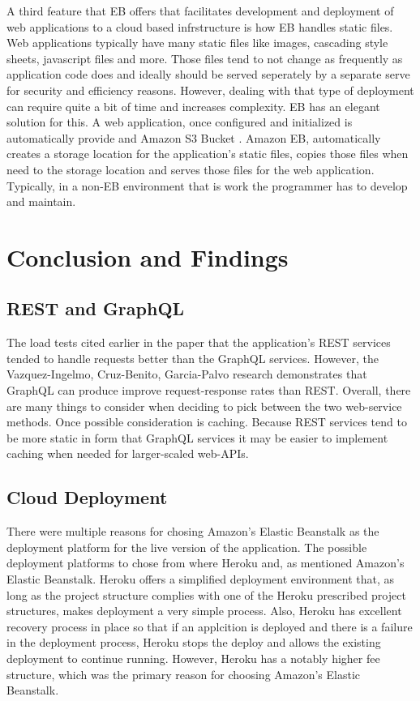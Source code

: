 A third feature that EB offers that facilitates development and deployment of 
web applications to a cloud based infrstructure is how EB handles static 
files.  Web applications typically have many static files like images, 
cascading style sheets, javascript files and more.  Those files tend to not 
change as frequently as application code does and ideally should be served 
seperately by a separate serve for security and efficiency reasons.  However, 
dealing with that type of deployment can require quite a bit of time and 
increases complexity.  EB has an elegant solution for this.  A web application, 
once configured and initialized is automatically provide and Amazon 
S3 Bucket \cite{S3Bucket2018}.  Amazon EB, automatically creates a storage 
location for the application's static files, copies those files when need 
to the storage location and serves those files for the web application.  
Typically, in a non-EB environment that is work the programmer has to develop 
and maintain.

\section{Conclusion and Findings}

\subsection{REST and GraphQL}
The load tests cited earlier in the paper that the application's REST services 
tended to handle requests better than the GraphQL services.  However, the 
Vazquez-Ingelmo, Cruz-Benito, Garcia-Palvo \cite{hid505Vzquez2017} research 
demonstrates that GraphQL can produce improve request-response rates than 
REST.  Overall, there are many things to consider when deciding to pick 
between the two web-service methods.  Once possible consideration is caching.  
Because REST services tend to be more static in form that GraphQL services it 
may be easier to implement caching when needed for larger-scaled web-APIs.

\subsection{Cloud Deployment}
There were multiple reasons for chosing Amazon's Elastic Beanstalk as the 
deployment platform for the live version of the application.  The possible 
deployment platforms to chose from where Heroku \cite{Heroku2018} and, as 
mentioned Amazon's Elastic Beanstalk.  Heroku offers a simplified deployment 
environment that, as long as the project structure complies with one of the 
Heroku prescribed project structures, makes deployment a very simple process.  
Also, Heroku has excellent recovery process in place so that if an applcition 
is deployed and there is a failure in the deployment process, Heroku stops the 
deploy and allows the existing deployment to continue running.  However, 
Heroku has a notably higher fee structure, which was the primary reason for 
choosing Amazon's Elastic Beanstalk.  

